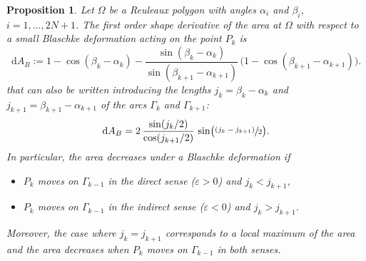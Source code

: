 \documentclass[JEP,XML,SOM,Unicode,NoFloatCountersInSection]{cedram}
\newcommand{\psfrac}[2]{\sfrac{(#1)}{#2}}
\let\epsilon\varepsilon
\theoremstyle{plain}
\newtheorem{proposition}[theorem]{Proposition}
\theoremstyle{definition}
\newcommand\de{\mathrm{d}}\let\dr\de
\let \e\epsilon
\begin{document}
\begin{proposition}\label{prop4}
Let $\Omega$ be a Reuleaux polygon with angles $\alpha_i$ and $\beta_i$, $i=1,\ldots, 2N+1$.
The first order shape derivative of the area at $\Omega$ with respect to a small Blaschke deformation acting on the point $P_k$ is
\[
\de A_B:=
1-\cos(\beta_k-\alpha_k) - \frac{\sin(\beta_k-\alpha_k)}{\sin(\beta_{k+1}-\alpha_{k+1})}\, \big(1- \cos(\beta_{k+1} - \alpha_{k+1})\big).
\]
that can also be written introducing the lengths $j_k=\beta_k-\alpha_k$ and $j_{k+1}=\beta_{k+1}
-\alpha_{k+1}$ of the arcs
$\Gamma_k$ and $\Gamma_{k+1}$:
\[
\de A_B=2\, \frac{\sin(j_k/2)}{\cos(j_{k+1}/2)}\,\sin\bigl(\psfrac{j_k-j_{k+1}}{2}\bigr).
\]
In particular, the area decreases under a Blaschke deformation if
\begin{itemize}
\item $P_k$ moves on $\Gamma_{k-1}$ in the direct sense ($\e>0$) \emph{and} $j_k<j_{k+1}$,
\item $P_k$ moves on $\Gamma_{k-1}$ in the indirect sense ($\e<0$) \emph{and} $j_k>j_{k+1}$.
\end{itemize}
Moreover, the case where $j_k=j_{k+1}$ corresponds to a local maximum of the area and the area decreases when $P_k$ moves on $\Gamma_{k-1}$ in both senses.
\end{proposition}
\end{document}
